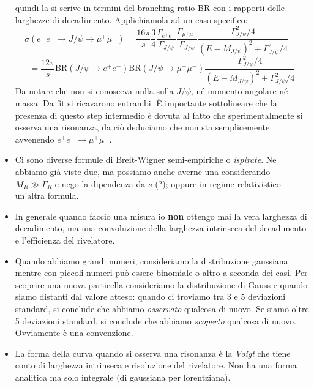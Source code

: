\begin{itemize}
\begin{equation*}
        \end{equation*}
        quindi la si scrive in termini del branching ratio BR con i rapporti delle larghezze di decadimento. Applichiamola ad un caso specifico:
        \begin{equation*}
            \sigma(e^+e^-\to J/\psi\to\mu^+\mu^-)=\frac{16\pi}s\frac{3}{4}\frac{\Gamma_{e^+e^-}}{\Gamma_{J/\psi}}\frac{\Gamma_{\mu^+\mu^-}}{\Gamma_{J/\psi}}\frac{\Gamma_{J/\psi}^2/4}{(E-M_{J/\psi})^2+\Gamma_{J/\psi}^2/4}=
        \end{equation*}
        \begin{equation*}
            =\frac{12\pi}s\text{BR}({J/\psi\to e^+e^-})\text{BR}({J/\psi\to\mu^+\mu^-})\frac{\Gamma_{J/\psi}^2/4}{(E-M_{J/\psi})^2+\Gamma_{J/\psi}^2/4}
        \end{equation*}
        Da notare che non si conosceva nulla sulla $J/\psi$, né momento angolare né massa. Da fit si ricavarono entrambi. È importante sottolineare che la presenza di questo step intermedio è dovuta al fatto che sperimentalmente si osserva una risonanza, da ciò deduciamo che non sta semplicemente avvenendo $e^+e^-\to\mu^+\mu^-$. 
        \item Ci sono diverse formule di Breit-Wigner semi-empiriche o \textit{ispirate}. Ne abbiamo già viste due, ma possiamo anche averne una considerando $M_R\gg\Gamma_R$ e nego la dipendenza da $s$ (?); oppure in regime relativistico un'altra formula. 
        \item In generale quando faccio una misura io \textbf{non} ottengo mai la vera larghezza di decadimento, ma una convoluzione della larghezza intrinseca del decadimento e l'efficienza del rivelatore. 
        \item Quando abbiamo grandi numeri, consideriamo la distribuzione gaussiana mentre con piccoli numeri può essere binomiale o altro a seconda dei casi. Per scoprire una nuova particella consideriamo la distribuzione di Gauss e quando siamo distanti dal valore atteso: quando ci troviamo tra 3 e 5 deviazioni standard, si conclude che abbiamo \textit{osservato} qualcosa di nuovo. Se siamo oltre 5 deviazioni standard, si conclude che abbiamo \textit{scoperto} qualcosa di nuovo. Ovviamente è una convenzione.
        \item La forma della curva quando si osserva una risonanza è la \textit{Voigt} che tiene conto di larghezza intrinseca e risoluzione del rivelatore. Non ha una forma analitica ma solo integrale (di gaussiana per lorentziana).
\end{itemize}
